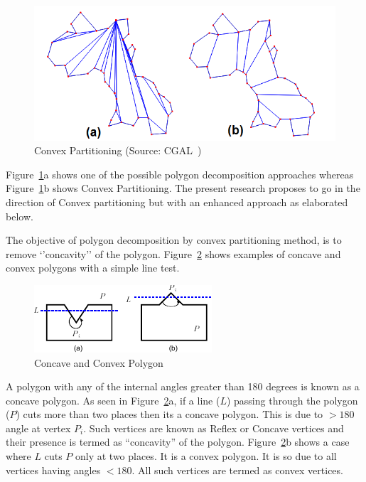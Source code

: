 
\begin{figure}[h]
\centering \includegraphics[width=0.62\linewidth]{images/convexcgal} 
\caption{Convex Partitioning (Source: CGAL~\cite{cgal})}
\label{fig_cgal}
\end{figure}


Figure~\ref{fig_cgal}a shows one of the possible polygon decomposition approaches whereas Figure~\ref{fig_cgal}b shows Convex Partitioning. The present research proposes to go in the direction of Convex partitioning but with an enhanced approach as elaborated below.


The objective of polygon decomposition by convex partitioning method, is to remove `'concavity'' of the polygon. Figure~\ref{fig_concave} shows examples of concave and convex polygons with a simple line test. 



\begin{figure}[h]
\centering \includegraphics[width=0.62\linewidth]{images/polyconcavity.pdf} 
\caption{Concave and Convex Polygon}
\label{fig_concave}
\end{figure}


A polygon with any of the internal angles greater than 180 degrees is known as a concave polygon. As seen in Figure~\ref{fig_concave}a, if a line ($L$) passing through the polygon ($P$) cuts more than two places then its a concave polygon. This is due to $>180$ angle at vertex $P_i$. Such vertices are known as Reflex or Concave vertices and their presence is termed as ``concavity'' of the polygon. Figure~\ref{fig_concave}b shows a case where $L$ cuts $P$ only at two places. It is a convex polygon. It is so due to all vertices having angles $<180$. All such vertices are termed as convex vertices.

